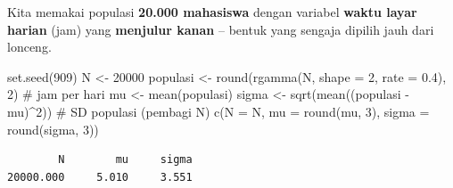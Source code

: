 \documentclass[
  indonesian,
  letterpaper,
]{book}
\newenvironment{Shaded}{\begin{snugshade}}{\end{snugshade}}
\newcommand{\AttributeTok}[1]{\textcolor[rgb]{0.40,0.45,0.13}{#1}}
\newcommand{\CommentTok}[1]{\textcolor[rgb]{0.37,0.37,0.37}{#1}}
\newcommand{\DecValTok}[1]{\textcolor[rgb]{0.68,0.00,0.00}{#1}}
\newcommand{\FloatTok}[1]{\textcolor[rgb]{0.68,0.00,0.00}{#1}}
\newcommand{\FunctionTok}[1]{\textcolor[rgb]{0.28,0.35,0.67}{#1}}
\newcommand{\NormalTok}[1]{\textcolor[rgb]{0.00,0.23,0.31}{#1}}
\newcommand{\OtherTok}[1]{\textcolor[rgb]{0.00,0.23,0.31}{#1}}
\newcommand{\SpecialCharTok}[1]{\textcolor[rgb]{0.37,0.37,0.37}{#1}}
\begin{document}
Kita memakai populasi \textbf{20.000 mahasiswa} dengan variabel
\textbf{waktu layar harian} (jam) yang \textbf{menjulur kanan} -- bentuk
yang sengaja dipilih jauh dari lonceng.

\begin{Shaded}
\begin{Highlighting}[]
\FunctionTok{set.seed}\NormalTok{(}\DecValTok{909}\NormalTok{)}
\NormalTok{N }\OtherTok{\textless{}{-}} \DecValTok{20000}
\NormalTok{populasi }\OtherTok{\textless{}{-}} \FunctionTok{round}\NormalTok{(}\FunctionTok{rgamma}\NormalTok{(N, }\AttributeTok{shape =} \DecValTok{2}\NormalTok{, }\AttributeTok{rate =} \FloatTok{0.4}\NormalTok{), }\DecValTok{2}\NormalTok{) }\CommentTok{\# jam per hari}
\NormalTok{mu }\OtherTok{\textless{}{-}} \FunctionTok{mean}\NormalTok{(populasi)}
\NormalTok{sigma }\OtherTok{\textless{}{-}} \FunctionTok{sqrt}\NormalTok{(}\FunctionTok{mean}\NormalTok{((populasi }\SpecialCharTok{{-}}\NormalTok{ mu)}\SpecialCharTok{\^{}}\DecValTok{2}\NormalTok{)) }\CommentTok{\# SD populasi (pembagi N)}
\FunctionTok{c}\NormalTok{(}\AttributeTok{N =}\NormalTok{ N, }\AttributeTok{mu =} \FunctionTok{round}\NormalTok{(mu, }\DecValTok{3}\NormalTok{), }\AttributeTok{sigma =} \FunctionTok{round}\NormalTok{(sigma, }\DecValTok{3}\NormalTok{))}
\end{Highlighting}
\end{Shaded}

\begin{verbatim}
        N        mu     sigma 
20000.000     5.010     3.551 
\end{verbatim}
\end{document}

